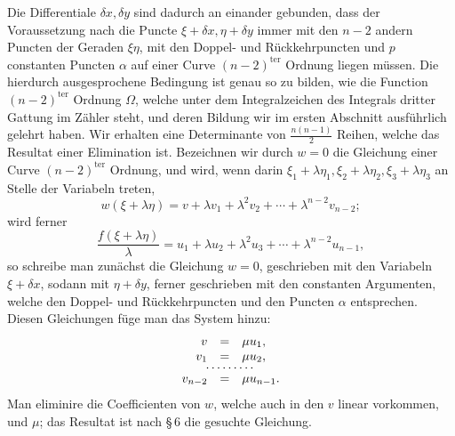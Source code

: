 \documentclass[10pt]{article}
\begin{document}
Die Differentiale \(\delta x,\delta y\) sind dadurch an einander gebunden, dass der Voraussetzung nach die Puncte \(\xi+\delta x,\eta+\delta y\) immer mit den \(n-2\) andern Puncten der Geraden \(\xi\eta\), mit den Doppel- und Rückkehrpuncten und \(p\) constanten Puncten \(\alpha\) auf einer Curve \((n-2)^{\mathrm{ter}}\) Ordnung liegen müssen. Die hierdurch ausgesprochene Bedingung ist genau so zu bilden, wie die Function \((n-2)^{\mathrm{ter}}\) Ordnung \(\Omega\), welche unter dem Integralzeichen des Integrals dritter Gattung im Zähler steht, und deren Bildung wir im ersten Abschnitt ausführlich gelehrt haben. Wir erhalten eine Determinante von \(\frac{n(n-1)}{2}\) Reihen, welche das Resultat einer Elimination ist. Bezeichnen wir durch \(w=0\) die Gleichung einer Curve \((n-2)^{\mathrm{ter}}\) Ordnung, und wird, wenn darin \(\xi_1+\lambda\eta_1,\xi_2+\lambda\eta_2,\xi_3+\lambda\eta_3\) an Stelle der Variabeln treten,
\[
w(\xi+\lambda\eta)=v+\lambda v_1+\lambda^2v_2+\cdots+\lambda^{n-2}v_{n-2};
\]
wird ferner
\[
\frac{f(\xi+\lambda\eta)}{\lambda}=u_1+\lambda u_2+\lambda^2u_3+\cdots+\lambda^{n-2}u_{n-1},
\]
so schreibe man zunächst die Gleichung \(w=0\), geschrieben mit den Variabeln \(\xi+\delta x\), sodann mit \(\eta+\delta y\), ferner geschrieben mit den constanten Argumenten, welche den Doppel- und Rückkehrpuncten und den Puncten \(\alpha\) entsprechen. Diesen Gleichungen füge man das System hinzu:
\[
\begin{array}{rcl}
v&=&\mu u_1,\\
v_1&=&\mu u_2,\\[-0.3em]
\multicolumn{3}{c}{\cdots\cdots\cdots}\\[-0.3em]
v_{n-2}&=&\mu u_{n-1}.
\end{array}
\]
Man eliminire die Coefficienten von \(w\), welche auch in den \(v\) linear vorkommen, und \(\mu\); das Resultat ist nach \S\,6 die gesuchte Gleichung.
\end{document}
